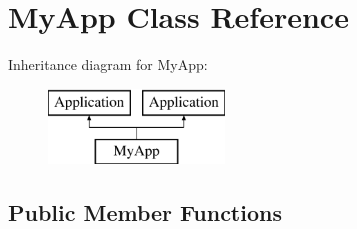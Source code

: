 \hypertarget{class_my_app}{}\section{My\+App Class Reference}
\label{class_my_app}
Inheritance diagram for My\+App\+:\begin{figure}[H]
\begin{center}
\leavevmode
\includegraphics[height=2.000000cm]{class_my_app}
\end{center}
\end{figure}
\subsection*{Public Member Functions}
